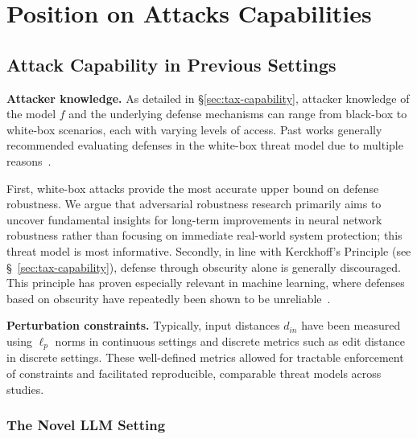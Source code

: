 \vspace{-10pt}
\section{Position on Attacks Capabilities}

\subsection{Attack Capability in Previous Settings}\label{sec:pos-capability-definition}
\textbf{Attacker knowledge.} As detailed in \S\ref{sec:tax-capability}, attacker knowledge of the model $f$ and the underlying defense mechanisms can range from black-box to white-box scenarios, each with varying levels of access. Past works generally recommended evaluating defenses in the white-box threat model due to multiple reasons~\cite{athalye_obfuscated_2018}. %

First, white-box attacks provide the most accurate upper bound on defense robustness. We argue that adversarial robustness research primarily aims to uncover fundamental insights for long-term improvements in neural network robustness rather than focusing on immediate real-world system protection; this threat model is most informative. Secondly, in line with Kerckhoff’s Principle (see \S~\ref{sec:tax-capability}), defense through obscurity alone is generally discouraged. This principle has proven especially relevant in machine learning, where defenses based on obscurity have repeatedly been shown to be unreliable~\cite{athalye_obfuscated_2018}.

\textbf{Perturbation constraints.} Typically, input distances $d_{in}$ have been measured using $\ell_p$ norms in continuous settings and discrete metrics such as edit distance in discrete settings. These well-defined metrics allowed for tractable enforcement of constraints and facilitated reproducible, comparable threat models across studies.
\vspace{-5pt}
\subsubsection{The Novel LLM Setting}\label{sec:capability-llm-setting}


